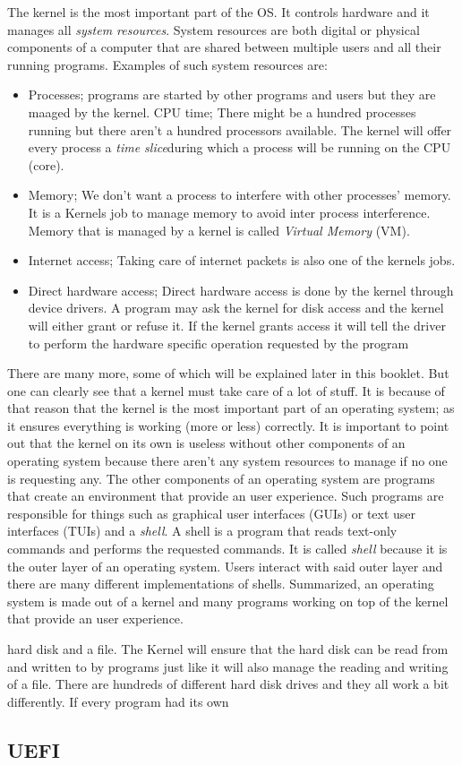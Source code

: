 The kernel is the most important part of the OS. It controls hardware and it
manages all \textit{system resources}. System resources are both digital or physical
components of a computer that are shared between multiple users and all their
running programs. Examples of such system resources are:
\begin{itemize}
\item Processes; programs are started by other programs and users but they are maaged by the kernel.
	CPU time; There might be a hundred processes running but there aren't a hundred processors available. The kernel will offer every process a \textit{time slice}during which a process will be running on the CPU (core).
\item Memory; We don't want a process to interfere with other processes' memory. It is a Kernels job to manage memory to avoid inter process interference. Memory that is managed by a kernel is called \textit{Virtual Memory} (VM).
\item Internet access; Taking care of internet packets is also one of the kernels jobs.
\item Direct hardware access; Direct hardware access is done by the kernel through device drivers. A program may ask the kernel for disk access and the kernel will either grant or refuse it. If the kernel grants access it will tell the driver to perform the hardware specific operation requested by the program
\end{itemize}
There are many more, some of which will be explained later in this booklet.
But one can clearly see that a kernel must take care of a lot of stuff. It
is because of that reason that the kernel is the most important part of an
operating system; as it ensures everything is working (more or less)
correctly. It is important to point out that the kernel on its own is useless
without other components of an operating system because there aren't any
system resources to manage if no one is requesting any.
The other components of an
operating system are programs that create an environment that provide an user
experience. Such programs are responsible for things such as graphical user
interfaces (GUIs) or text user interfaces (TUIs) and a \textit{shell}. A shell is a
program that reads text-only commands and performs the requested commands. It
is called \textit{shell} because it is the outer layer of an operating system. Users
interact with said outer layer and there are many different implementations
of shells. Summarized, an operating system is made out of a kernel and many programs working on top of the kernel that provide an user experience.


hard disk and a
file. The Kernel will ensure that the hard disk can be read from and written
to by programs just like it will also manage the reading and writing of a
file. There are hundreds of different hard disk drives and they all work a
bit differently. If every program had its own 

\subsection{UEFI}
